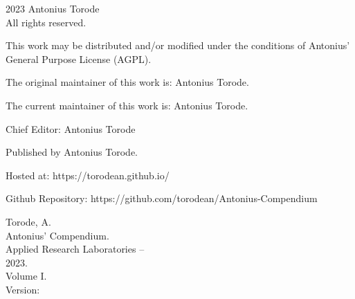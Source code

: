 \pagestyle{empty}
\begingroup
\footnotesize
\parindent 0pt
\parskip \baselineskip
\textcopyright{} 2023 Antonius Torode \\
All rights reserved.

This work may be distributed and/or modified under the conditions of Antonius’ General Purpose License (AGPL).

The original maintainer of this work is: Antonius Torode.

The current maintainer of this work is: Antonius Torode.


Chief Editor: Antonius Torode


Published by Antonius Torode. 

Hosted at: https://torodean.github.io/

Github Repository: https://github.com/torodean/Antonius-Compendium


\vfill

Torode, A.\\
\hspace*{1em} Antonius' Compendium. \\
\hspace*{2em} Applied Research Laboratories -- \\
\hspace*{2em} 2023. \\
\hspace*{2em} Volume I. \\
\hspace*{2em} Version: \Version



\endgroup
\clearpage